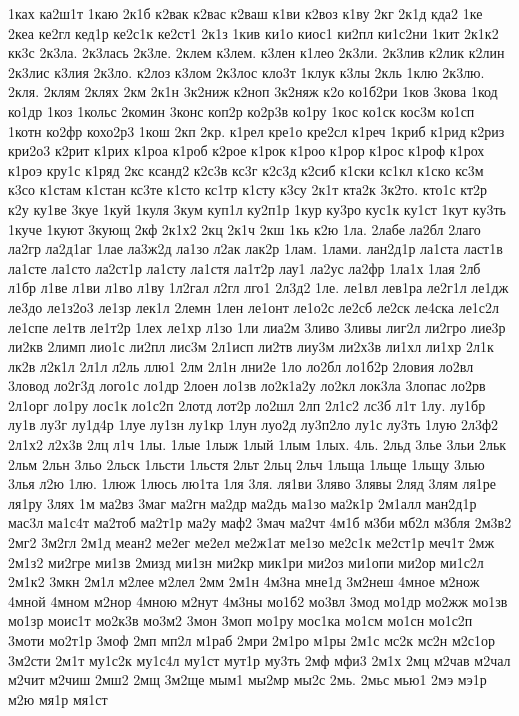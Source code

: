 {1ках
ка2ш1т
1каю
2к1б
к2вак
к2вас
к2ваш
к1ви
к2воз
к1ву
2кг
2к1д
кда2
1ке
2кеа
ке2гл
кед1р
ке2с1к
ке2ст1
2к1з
1кив
ки1о
киос1
ки2пл
ки1с2ни
1кит
2к1к2
кк3с
2к3ла.
2к3лась
2к3ле.
2клем
к3лем.
к3лен
к1лео
2к3ли.
2к3лив
к2лик
к2лин
2к3лис
к3лия
2к3ло.
к2лоз
к3лом
2к3лос
кло3т
1клук
к3лы
2кль
1клю
2к3лю.
2кля.
2клям
2клях
2км
2к1н
3к2ниж
к2ноп
3к2няж
к2о
ко1б2ри
1ков
3кова
1код
ко1др
1коз
1кольс
2комин
3конс
коп2р
ко2р3в
ко1ру
1кос
ко1ск
кос3м
ко1сп
1котн
ко2фр
кохо2р3
1кош
2кп
2кр.
к1рел
кре1о
кре2сл
к1реч
1криб
к1рид
к2риз
кри2о3
к2рит
к1рих
к1роа
к1роб
к2рое
к1рок
к1роо
к1рор
к1рос
к1роф
к1рох
к1роэ
кру1с
к1ряд
2кс
ксанд2
к2с3в
кс3г
к2с3д
к2сиб
к1ски
кс1кл
к1ско
кс3м
к3со
к1стам
к1стан
кс3те
к1сто
кс1тр
к1сту
к3су
2к1т
кта2к
3к2то.
кто1с
кт2р
к2у
ку1ве
3куе
1куй
1куля
3кум
куп1л
ку2п1р
1кур
ку3ро
кус1к
ку1ст
1кут
ку3ть
1куче
1куют
3кующ
2кф
2к1х2
2кц
2к1ч
2кш
1кь
к2ю
1ла.
2лабе
ла2бл
2лаго
ла2гр
ла2д1аг
1лае
ла3ж2д
ла1зо
л2ак
лак2р
1лам.
1лами.
лан2д1р
ла1ста
ласт1в
ла1сте
ла1сто
ла2ст1р
ла1сту
ла1стя
ла1т2р
лау1
ла2ус
ла2фр
1ла1х
1лая
2лб
л1бр
л1ве
л1ви
л1во
л1ву
1л2гал
л2гл
лго1
2л3д2
1ле.
ле1вл
лев1ра
ле2г1л
ле1дж
ле3до
ле1з2о3
ле1зр
лек1л
2лемн
1лен
ле1онт
ле1о2с
ле2сб
ле2ск
ле4ска
ле1с2л
ле1спе
ле1тв
ле1т2р
1лех
ле1хр
л1зо
1ли
лиа2м
3ливо
3ливы
лиг2л
ли2гро
лие3р
ли2кв
2лимп
лио1с
ли2пл
лис3м
2л1исп
ли2тв
лиу3м
ли2х3в
ли1хл
ли1хр
2л1к
лк2в
л2к1л
2л1л
л2ль
ллю1
2лм
2л1н
лни2е
1ло
ло2бл
ло1б2р
2ловия
ло2вл
3ловод
ло2г3д
лого1с
ло1др
2лоен
ло1зв
ло2к1а2у
ло2кл
лок3ла
3лопас
ло2рв
2л1орг
ло1ру
лос1к
ло1с2п
2лотд
лот2р
ло2шл
2лп
2л1с2
лс3б
л1т
1лу.
лу1бр
лу1в
лу3г
лу1д4р
1луе
лу1зн
лу1кр
1лун
луо2д
лу3п2ло
лу1с
лу3ть
1лую
2л3ф2
2л1х2
л2х3в
2лц
л1ч
1лы.
1лые
1лыж
1лый
1лым
1лых.
4ль.
2льд
3лье
3льи
2льк
2льм
2льн
3льо
2льск
1льсти
1льстя
2льт
2льц
2льч
1льща
1льще
1льщу
3лью
3лья
л2ю
1лю.
1люж
1люсь
лю1та
1ля
3ля.
ля1ви
3ляво
3лявы
2ляд
3лям
ля1ре
ля1ру
3лях
1м
ма2вз
3маг
ма2гн
ма2др
ма2дь
ма1зо
ма2к1р
2м1алл
ман2д1р
мас3л
ма1с4т
ма2тоб
ма2т1р
ма2у
маф2
3мач
ма2чт
4м1б
м3би
мб2л
м3бля
2м3в2
2мг2
3м2гл
2м1д
меан2
ме2ег
ме2ел
ме2ж1ат
ме1зо
ме2с1к
ме2ст1р
меч1т
2мж
2м1з2
ми2гре
ми1зв
2мизд
ми1зн
ми2кр
мик1ри
ми2оз
ми1опи
ми2ор
ми1с2л
2м1к2
3мкн
2м1л
м2лее
м2лел
2мм
2м1н
4м3на
мне1д
3м2неш
4мное
м2нож
4мной
4мном
м2нор
4мною
м2нут
4м3ны
мо1б2
мо3вл
3мод
мо1др
мо2жж
мо1зв
мо1зр
моис1т
мо2к3в
мо3м2
3мон
3моп
мо1ру
мос1ка
мо1см
мо1сн
мо1с2п
3моти
мо2т1р
3моф
2мп
мп2л
м1раб
2мри
2м1ро
м1ры
2м1с
мс2к
мс2н
м2с1ор
3м2сти
2м1т
му1с2к
му1с4л
му1ст
мут1р
му3ть
2мф
мфи3
2м1х
2мц
м2чав
м2чал
м2чит
м2чиш
2мш2
2мщ
3м2ще
мым1
мы2мр
мы2с
2мь.
2мьс
мью1
2мэ
мэ1р
м2ю
мя1р
мя1ст
}
